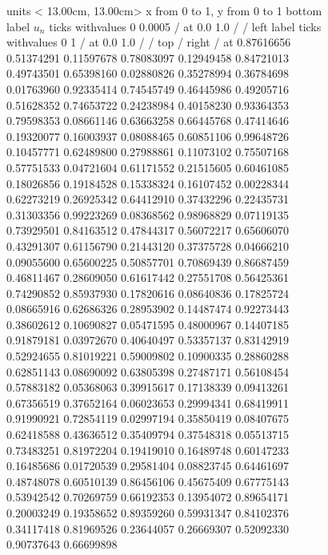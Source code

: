 
\def\fiverm {}%
  
\begin{figure} \centering \beginpicture
\setcoordinatesystem units < 13.00cm, 13.00cm>
\setplotarea x from 0 to 1, y from 0 to 1
\axis bottom
  label $u_{n}$
  ticks withvalues        0   0.0005  / at 0.0 1.0 / / 
\axis left
  label 
  ticks withvalues         0        1  / at 0.0 1.0 / / 
\axis top /  \axis right /
 at
   0.87616656   0.51374291
   0.11597678   0.78083097
   0.12949458   0.84721013
   0.49743501   0.65398160
   0.02880826   0.35278994
   0.36784698   0.01763960
   0.92335414   0.74545749
   0.46445986   0.49205716
   0.51628352   0.74653722
   0.24238984   0.40158230
   0.93364353   0.79598353
   0.08661146   0.63663258
   0.66445768   0.47414646
   0.19320077   0.16003937
   0.08088465   0.60851106
   0.99648726   0.10457771
   0.62489800   0.27988861
   0.11073102   0.75507168
   0.57751533   0.04721604
   0.61171552   0.21515605
   0.60461085   0.18026856
   0.19184528   0.15338324
   0.16107452   0.00228344
   0.62273219   0.26925342
   0.64412910   0.37432296
   0.22435731   0.31303356
   0.99223269   0.08368562
   0.98968829   0.07119135
   0.73929501   0.84163512
   0.47844317   0.56072217
   0.65606070   0.43291307
   0.61156790   0.21443120
   0.37375728   0.04666210
   0.09055600   0.65600225
   0.50857701   0.70869439
   0.86687459   0.46811467
   0.28609050   0.61617442
   0.27551708   0.56425361
   0.74290852   0.85937930
   0.17820616   0.08640836
   0.17825724   0.08665916
   0.62686326   0.28953902
   0.14487474   0.92273443
   0.38602612   0.10690827
   0.05471595   0.48000967
   0.14407185   0.91879181
   0.03972670   0.40640497
   0.53357137   0.83142919
   0.52924655   0.81019221
   0.59009802   0.10900335
   0.28860288   0.62851143
   0.08690092   0.63805398
   0.27487171   0.56108454
   0.57883182   0.05368063
   0.39915617   0.17138339
   0.09413261   0.67356519
   0.37652164   0.06023653
   0.29994341   0.68419911
   0.91990921   0.72854119
   0.02997194   0.35850419
   0.08407675   0.62418588
   0.43636512   0.35409794
   0.37548318   0.05513715
   0.73483251   0.81972204
   0.19419010   0.16489748
   0.60147233   0.16485686
   0.01720539   0.29581404
   0.08823745   0.64461697
   0.48748078   0.60510139
   0.86456106   0.45675409
   0.67775143   0.53942542
   0.70269759   0.66192353
   0.13954072   0.89654171
   0.20003249   0.19358652
   0.89359260   0.59931347
   0.84102376   0.34117418
   0.81969526   0.23644057
   0.26669307   0.52092330
   0.90737643   0.66699898

\end{figure}
